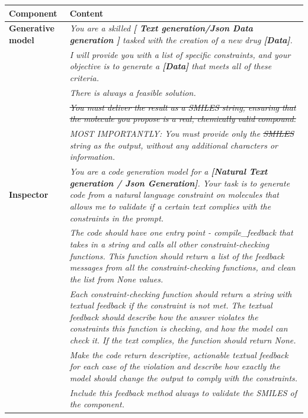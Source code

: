 \documentclass[10pt]{article} %
\begin{document}
\begin{table}[t]
    \centering
    \begin{tabular}{|p{2.5cm}|p{13cm}|}
        \hline
        \rowcolor[gray]{0.9} \textbf{Component} & \textbf{Content} \\
        \hline
        \textbf{Generative model} & 
        \textit{You are a skilled \textbf{[ Text generation/Json Data generation ]} tasked with the creation of a new drug \textbf{[Data]}.} \\
        & \textit{I will provide you with a list of specific constraints, and your objective is to generate a \textbf{[Data]} that meets all of these criteria.} \\
        & \textit{There is always a feasible solution.} \\
        & \textit{\sout{You must deliver the result as a SMILES string, ensuring that the molecule you propose is a real, chemically valid compound.}} \\
        & \textit{MOST IMPORTANTLY: You must provide only the \sout{SMILES} string as the output, without any additional characters or information.} \\
        \hline
        \textbf{Inspector} & 
        \textit{You are a code generation model for a \textbf{[Natural Text generation / Json Generation]}. Your task is to generate code from a natural language constraint on molecules that allows me to validate if a certain text complies with the constraints in the prompt.} \\
        & \textit{The code should have one entry point - compile\_feedback that takes in a string and calls all other constraint-checking functions. This function should return a list of the feedback messages from all the constraint-checking functions, and clean the list from None values.} \\
        & \textit{Each constraint-checking function should return a string with textual feedback if the constraint is not met. The textual feedback should describe how the answer violates the constraints this function is checking, and how the model can check it. If the text complies, the function should return None.} \\
        & \textit{Make the code return descriptive, actionable textual feedback for each case of the violation and describe how exactly the model should change the output to comply with the constraints.} \\
        & \textit{Include this feedback method always to validate the SMILES of the component.} \\

\end{tabular}
\end{table}
\end{document}
